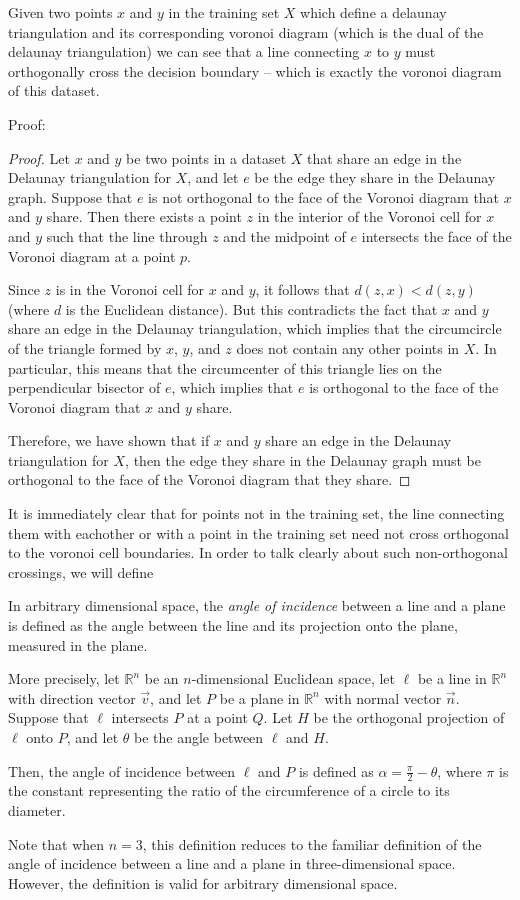 Given two points $x$ and $y$ in the training set $X$ which define a delaunay
triangulation and its corresponding voronoi diagram (which is the dual
of the delaunay triangulation) we can see that a line connecting $x$ to
$y$ must orthogonally cross the decision boundary -- which is exactly the voronoi
diagram of this dataset.

Proof:
\begin{proof}
Let $x$ and $y$ be two points in a dataset $X$ that share an edge in the Delaunay triangulation for $X$, and let $e$ be the edge they share in the Delaunay graph. Suppose that $e$ is not orthogonal to the face of the Voronoi diagram that $x$ and $y$ share. Then there exists a point $z$ in the interior of the Voronoi cell for $x$ and $y$ such that the line through $z$ and the midpoint of $e$ intersects the face of the Voronoi diagram at a point $p$.

Since $z$ is in the Voronoi cell for $x$ and $y$, it follows that $d(z, x) < d(z, y)$ (where $d$ is the Euclidean distance). But this contradicts the fact that $x$ and $y$ share an edge in the Delaunay triangulation, which implies that the circumcircle of the triangle formed by $x$, $y$, and $z$ does not contain any other points in $X$. In particular, this means that the circumcenter of this triangle lies on the perpendicular bisector of $e$, which implies that $e$ is orthogonal to the face of the Voronoi diagram that $x$ and $y$ share.

Therefore, we have shown that if $x$ and $y$ share an edge in the Delaunay triangulation for $X$, then the edge they share in the Delaunay graph must be orthogonal to the face of the Voronoi diagram that they share.
\end{proof}
It is immediately clear that for points not in the training set,
the line connecting them with eachother or with a point in the
training set need not cross orthogonal to the voronoi cell
boundaries. In order to talk clearly about such non-orthogonal
crossings, we will define
\begin{definition}
In arbitrary dimensional space, the \emph{angle of incidence} between a line and a plane is defined as the angle between the line and its projection onto the plane, measured in the plane.

More precisely, let $\mathbb{R}^n$ be an $n$-dimensional Euclidean space, let $\ell$ be a line in $\mathbb{R}^n$ with direction vector $\vec{v}$, and let $P$ be a plane in $\mathbb{R}^n$ with normal vector $\vec{n}$. Suppose that $\ell$ intersects $P$ at a point $Q$. Let $H$ be the orthogonal projection of $\ell$ onto $P$, and let $\theta$ be the angle between $\ell$ and $H$.

Then, the angle of incidence between $\ell$ and $P$ is defined as $\alpha = \frac{\pi}{2} - \theta$, where $\pi$ is the constant representing the ratio of the circumference of a circle to its diameter.

Note that when $n=3$, this definition reduces to the familiar definition of the angle of incidence between a line and a plane in three-dimensional space. However, the definition is valid for arbitrary dimensional space.
\end{definition}

